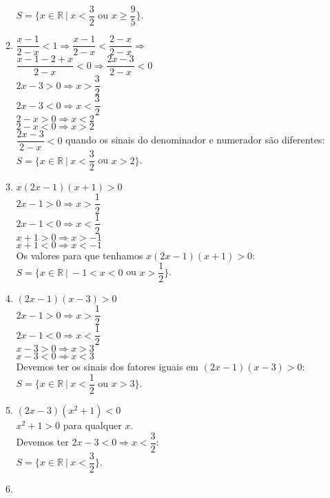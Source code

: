 \begin{enumerate}
\begin{enumerate}
			$S =  \lbrace x \in \mathbb{R} \ |\ x < \dfrac{3}{2}$ ou $x \geq \dfrac{9}{5}\rbrace$.
			\item
			$\dfrac{x - 1}{2 - x} < 1 \Rightarrow \dfrac{x - 1}{2 - x} < \dfrac{2 - x}{2 - x}\Rightarrow$\\[6pt]
			$\dfrac{x - 1 - 2 + x}{2 - x} < 0 \Rightarrow \dfrac{2x - 3}{2 - x} < 0$\\[6pt]
			$2x - 3 > 0 \Rightarrow x > \dfrac{3}{2}$\\[6pt]
			$2x - 3 < 0 \Rightarrow x < \dfrac{3}{2}$\\[6pt]
			$2 - x > 0 \Rightarrow x < 2$\\
			$2 - x < 0 \Rightarrow x > 2$\\	
			$\dfrac{2x - 3}{2 - x} < 0$ quando os sinais do denominador e numerador são diferentes:\\[6pt]
			$S =  \lbrace x \in \mathbb{R} \ |\ x < \dfrac{3}{2}$ ou $x > 2\rbrace$.
			\addtocounter{enumii}{1}
			\item
			$x(2x - 1)(x + 1) > 0$\\
			$2x - 1 > 0 \Rightarrow x > \dfrac{1}{2}$\\[6pt]
			$2x - 1 < 0 \Rightarrow x < \dfrac{1}{2}$\\[6pt]
			$x + 1 > 0 \Rightarrow x > -1$\\
			$x + 1 < 0 \Rightarrow x < -1$\\
			Os valores para que tenhamos $x(2x - 1)(x + 1) > 0$:\\
			$S =  \lbrace x \in \mathbb{R} \ |\ -1 < x < 0$ ou $x > \dfrac{1}{2} \rbrace$.
			\item
			$(2x - 1)(x - 3) > 0$\\
			$2x - 1 > 0 \Rightarrow x > \dfrac{1}{2}$\\[6pt]
			$2x - 1 < 0 \Rightarrow x < \dfrac{1}{2}$\\[6pt]
			$x - 3 > 0 \Rightarrow x > 3$\\
			$x - 3 < 0 \Rightarrow x < 3$\\
			Devemos ter os sinais dos fatores iguais em 	$(2x - 1)(x - 3) > 0$: 
			$S =  \lbrace x \in \mathbb{R} \ |\ x < \dfrac{1}{2}$ ou $x > 3 \rbrace$.
			\item			
			$(2x - 3)(x^2 + 1) < 0$\\
			$x^2 + 1 > 0$ para qualquer $x$.\\
			Devemos ter $2x - 3 < 0 \Rightarrow x < \dfrac{3}{2}$:\\
			$S =  \lbrace x \in \mathbb{R} \ |\ x < \dfrac{3}{2} \rbrace$.
			\item

\end{enumerate}
\end{enumerate}
